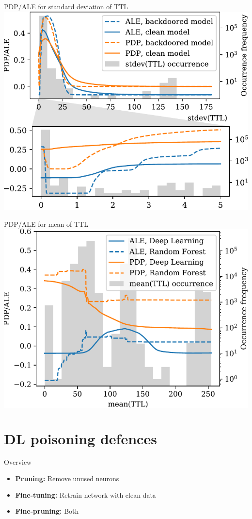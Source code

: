 \documentclass[xcolor={dvipsnames}]{beamer}
\begin{document}
\begin{frame}{PDP/ALE for standard deviation of TTL}
\centering
\includegraphics[width=0.8\columnwidth]{figures/pdpale2017nn_joint_2.pdf}
\end{frame}

\begin{frame}{PDP/ALE for mean of TTL}
\centering
\includegraphics[width=0.8\columnwidth]{figures/ttlmean.pdf}
\end{frame}

\section{DL poisoning defences}
\begin{frame}{Overview}
\begin{itemize}
\item \textbf{Pruning:} Remove unused neurons
\item \textbf{Fine-tuning:} Retrain network with clean data
\item \textbf{Fine-pruning:} Both
\end{itemize}
\end{frame}
\end{document}
